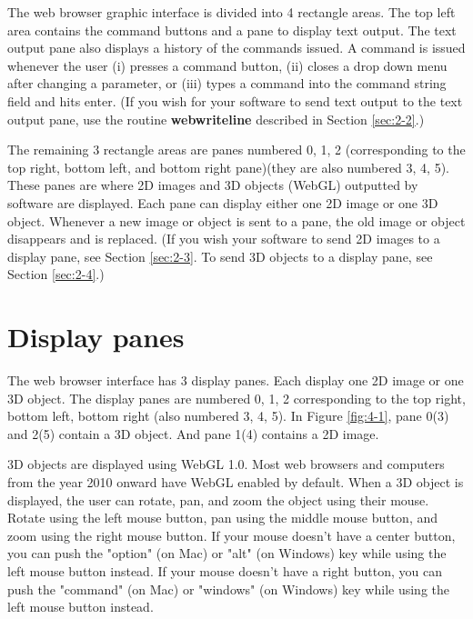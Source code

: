 The web browser graphic interface is divided into 4 rectangle areas. The top left area contains the command buttons
and a pane to display text output. The text output pane also displays a history of the commands issued. A command is
issued whenever the user (i) presses a command button, (ii) closes a drop down menu after 
changing a parameter, or (iii) types a command into the command string field and hits enter. (If you wish for
your software to send text output to the text output pane, use the routine \textbf{webwriteline} described in Section 
\ref{sec:2-2}.)

The remaining 3 rectangle areas are panes numbered 0, 1, 2 (corresponding to the top right, bottom left, and 
bottom right pane)(they are also numbered 3, 4, 5). These panes are where 2D images and 3D objects (WebGL) 
outputted by software are displayed. Each
pane can display either one 2D image or one 3D object. Whenever a new image or object is sent to a pane, the old
image or object disappears and is replaced. (If you wish your software to send 2D images to a display pane, see Section 
\ref{sec:2-3}. To send 3D objects to a display pane, see Section \ref{sec:2-4}.)

\section{Display panes}
\label{sec:4-4}
The web browser interface has 3 display panes. Each display one 2D image or one 3D object. The display panes 
are numbered 0, 1, 2 corresponding to the top right, bottom left, bottom right (also numbered 3, 4, 5). In Figure \ref{fig:4-1},
pane 0(3) and 2(5) contain a 3D object. And pane 1(4) contains a 2D image.

3D objects are displayed using WebGL 1.0. Most web browsers and computers from the year 2010 onward have WebGL enabled
by default. When a 3D object is displayed, the user can rotate, pan, and zoom the object using their mouse. Rotate
using the left mouse button, pan using the middle mouse button, and zoom using the right mouse button. If your mouse
doesn't have a center button, you can push the "option" (on Mac) or "alt" (on Windows) key while using the left mouse button 
instead. If your mouse doesn't have a right button, you can push the "command" (on Mac) or "windows" (on Windows) key 
while using the left mouse button instead.

